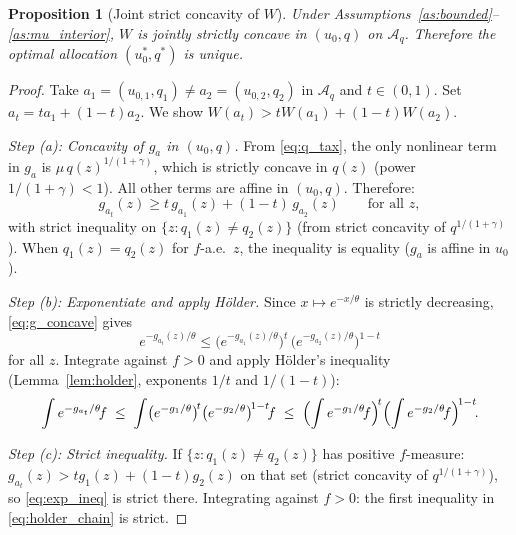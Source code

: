 \documentclass[12pt,a4paper]{article}
\theoremstyle{definition}
\theoremstyle{plain}
\newtheorem{proposition}{Proposition}[section]
\theoremstyle{remark}
\newcommand{\calA}{\mathcal{A}}
\begin{document}
\begin{proposition}[Joint strict concavity of $W$]
\label{prop:unique_QL}
Under Assumptions~\ref{as:bounded}--\ref{as:mu_interior},
$W$ is jointly strictly concave in $(u_0, q)$ on
$\calA_q$.  Therefore the optimal allocation
$(u_0^*, q^*)$ is unique.
\end{proposition}

\begin{proof}
Take $a_1 = (u_{0,1}, q_1) \neq a_2 = (u_{0,2}, q_2)$
in $\calA_q$ and $t \in (0,1)$.  Set $a_t = ta_1 +
(1-t)a_2$.  We show $W(a_t) > tW(a_1) + (1-t)W(a_2)$.

\emph{Step (a): Concavity of $g_a$ in $(u_0, q)$.}
From \eqref{eq:q_tax}, the only nonlinear term in $g_a$
is $\mu\,q(z)^{1/(1+\gamma)}$, which is strictly concave
in $q(z)$ (power $1/(1+\gamma) < 1$).  All other terms
are affine in $(u_0, q)$.  Therefore:
\begin{equation}
\label{eq:g_concave}
  g_{a_t}(z) \geq t\,g_{a_1}(z) + (1-t)\,g_{a_2}(z)
  \qquad \text{for all } z,
\end{equation}
with strict inequality on
$\{z : q_1(z) \neq q_2(z)\}$ (from strict concavity of
$q^{1/(1+\gamma)}$).  When $q_1(z) = q_2(z)$ for
$f$-a.e.\ $z$, the inequality is equality
($g_a$ is affine in $u_0$).

\emph{Step (b): Exponentiate and apply H\"{o}lder.}
Since $x \mapsto e^{-x/\theta}$ is strictly decreasing,
\eqref{eq:g_concave} gives
\begin{equation}
\label{eq:exp_ineq}
  e^{-g_{a_t}(z)/\theta}
  \leq
  \bigl(e^{-g_{a_1}(z)/\theta}\bigr)^{\!t}\,
  \bigl(e^{-g_{a_2}(z)/\theta}\bigr)^{\!1-t}
\end{equation}
for all $z$.  Integrate against $f > 0$ and apply
H\"{o}lder's inequality
(Lemma~\ref{lem:holder}, exponents $1/t$ and $1/(1-t)$):
\begin{equation}
\label{eq:holder_chain}
  \int e^{-g_{a_t}/\theta}\!f
  \;\leq\;
  \int \bigl(e^{-g_1/\theta}\bigr)^{\!t}
  \bigl(e^{-g_2/\theta}\bigr)^{\!1-t}\!f
  \;\leq\;
  \Bigl(\int e^{-g_1/\theta}\!f\Bigr)^{\!t}
  \Bigl(\int e^{-g_2/\theta}\!f\Bigr)^{\!1-t}\!.
\end{equation}

\emph{Step (c): Strict inequality.}
If $\{z : q_1(z) \neq q_2(z)\}$ has positive $f$-measure:
$g_{a_t}(z) > tg_1(z) + (1-t)g_2(z)$ on that set
(strict concavity of $q^{1/(1+\gamma)}$), so
\eqref{eq:exp_ineq} is strict there.  Integrating
against $f > 0$: the first inequality in
\eqref{eq:holder_chain} is strict.


\end{proof}
\end{document}
